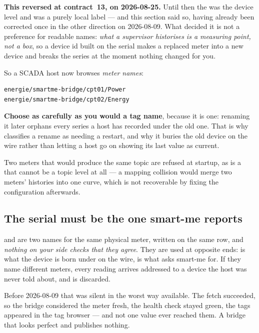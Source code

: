 \begin{warning}
\textbf{This reversed at contract~13, on 2026-08-25.} Until then the  was the
device level and  was a purely local label --- and this section said so, having
already been corrected once in the other direction on 2026-08-09. What decided it is not a
preference for readable names: \emph{what a supervisor historises is a measuring point, not a
box}, so a device id built on the serial makes a replaced meter into a new device and breaks the
series at the moment nothing changed for you.

So a SCADA host now browses \emph{meter names}:

\begin{lstlisting}
energie/smartme-bridge/cpt01/Power
energie/smartme-bridge/cpt02/Energy
\end{lstlisting}

\textbf{Choose  as carefully as you would a tag name}, because it is one:
renaming it later orphans every series a host has recorded under the old one. That is why
\prog{} classifies a rename as needing a restart, and why it buries the old device on the wire
rather than letting a host go on showing its last value as current.
\end{warning}

Two meters that would produce the same topic are refused at startup, as is a 
that cannot be a topic level at all --- a mapping collision would merge two meters' histories
into one curve, which is not recoverable by fixing the configuration afterwards.

\subsection{The serial must be the one smart-me reports}
\label{sec:serialmustmatch}

 and  are two names for the same physical meter, written on the
same row, and \emph{nothing on your side checks that they agree}. They are used at opposite
ends:  is what the device is born under on the wire,  is what
\prog asks smart-me for. If they name different meters, every reading arrives addressed to a
device the host was never told about, and is discarded.

Before 2026-08-09 that was silent in the worst way available. The fetch succeeded, so the
bridge considered the meter fresh, the health check stayed green, the tags appeared in the
tag browser --- and not one value ever reached them. A bridge that looks perfect and publishes
nothing.

